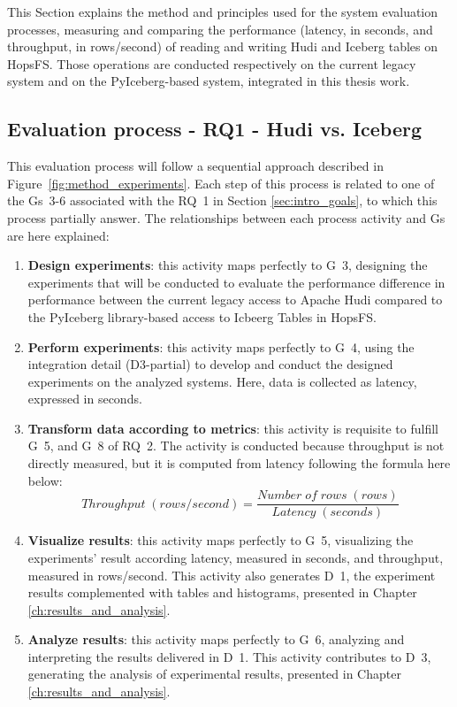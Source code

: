 This Section explains the method and principles used for the system evaluation processes, measuring and comparing the performance (latency, in seconds, and throughput, in rows/second) of reading and writing Hudi and Iceberg tables on \gls{HopsFS}. Those operations are conducted respectively on the current legacy system and on the PyIceberg-based system, integrated in this thesis work.

\subsection{Evaluation process - RQ1 - Hudi vs. Iceberg}
\label{subsec:system_eval_hudi_iceberg}
This evaluation process will follow a sequential approach described in Figure~\ref{fig:method_experiments}. Each step of this process is related to one of the \glspl{G}~3-6 associated with the \gls{RQ}~1 in Section \ref{sec:intro_goals}, to which this process partially answer. The relationships between each process activity and \glspl{G} are here explained:
\begin{enumerate}
    \item \textbf{Design experiments}: this activity maps perfectly to \gls{G}~3, designing the experiments that will be conducted to evaluate the performance difference in performance between the current legacy access to Apache Hudi compared to the PyIceberg library-based access to Icbeerg Tables in \gls{HopsFS}. 
    \item \textbf{Perform experiments}: this activity maps perfectly to \gls{G}~4, using the integration detail (\gls{D}3-partial) to develop and conduct the designed experiments on the analyzed systems. Here, data is collected as latency, expressed in seconds.
    \item \textbf{Transform data according to metrics}: this activity is requisite to fulfill \gls{G}~5, and \gls{G}~8 of \gls{RQ}~2. The activity is conducted because throughput is not directly measured, but it is computed from latency following the formula here below:
    \[ Throughput \; (rows/second) = \frac{Number \; of \; rows \; (rows)}{Latency \;(seconds)}\]
    \item \textbf{Visualize results}: this activity maps perfectly to \gls{G}~5, visualizing the experiments' result according latency, measured in seconds, and throughput, measured in rows/second. This activity also generates \gls{D}~1, the experiment results complemented with tables and histograms, presented in Chapter \ref{ch:results_and_analysis}.
    \item \textbf{Analyze results}: this activity maps perfectly to \gls{G}~6, analyzing and interpreting the results delivered in \gls{D}~1. This activity contributes to \gls{D}~3, generating the analysis of experimental results, presented in Chapter \ref{ch:results_and_analysis}.
\end{enumerate}
